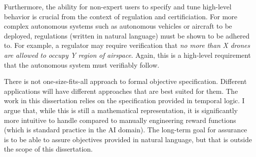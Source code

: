 Furthermore, the ability for non-expert users to specify and tune high-level behavior is crucial from the context of regulation and certificiation. For more complex autonomous systems such as autonomous vehicles or aircraft to be deployed, regulations (written in natural language) must be shown to be adhered to. For example, a regulator may require verification that \emph{no more than X drones are allowed to occupy Y region of airspace}. Again, this is a high-level requirement that the autonomous system must verifiably follow. 

There is not one-size-fits-all approach to formal objective specification. Different applications will have different approaches that are best suited for them. The work in this dissertation relies on the specification provided in temporal logic. I argue that, while this is still a mathematical representation, it is significantly more intuitive to handle compared to manually engineering reward functions (which is standard practice in the AI domain). The long-term goal for assurance is to be able to assure objectives provided in natural language, but that is outside the scope of this dissertation. 










